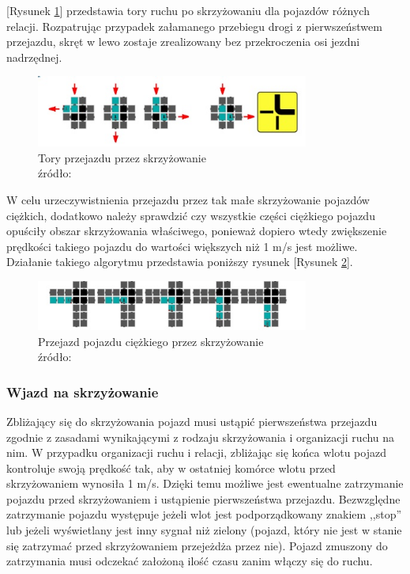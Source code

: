 \documentclass{sprawozdanie-agh}
\begin{document}
	[Rysunek \ref{fig:S2}] przedstawia tory ruchu po skrzyżowaniu dla pojazdów różnych relacji. Rozpatrując przypadek załamanego przebiegu drogi z pierwszeństwem przejazdu, skręt w lewo zostaje zrealizowany bez przekroczenia osi jezdni nadrzędnej.

	\begin{figure}[H]
		\centering
		\captionsetup{justification=centering}
		\includegraphics[width=0.8\textwidth]{S2.jpg}
		\caption{Tory przejazdu przez skrzyżowanie \\ źródło: \cite{artykulyNaPlycie}}
		\label{fig:S2}
	\end{figure}

	W celu urzeczywistnienia przejazdu przez tak małe skrzyżowanie pojazdów ciężkich, dodatkowo należy sprawdzić czy wszystkie części ciężkiego pojazdu opuściły obszar skrzyżowania właściwego, ponieważ dopiero wtedy zwiększenie prędkości takiego pojazdu do wartości większych niż 1 m/s jest możliwe. Działanie takiego algorytmu przedstawia poniższy rysunek [Rysunek \ref{fig:S3}].

	\begin{figure}[H]
		\centering
		\captionsetup{justification=centering}
		\includegraphics[width=0.8\textwidth]{S3.jpg}
		\caption{Przejazd pojazdu ciężkiego przez skrzyżowanie \\ źródło: \cite{artykulyNaPlycie}}
		\label{fig:S3}
	\end{figure}


	\subsubsection{Wjazd na skrzyżowanie}

	Zbliżający się do skrzyżowania pojazd musi ustąpić pierwszeństwa przejazdu zgodnie z zasadami wynikającymi z rodzaju skrzyżowania i organizacji ruchu na nim. W przypadku organizacji ruchu i relacji, zbliżając się końca wlotu pojazd kontroluje swoją prędkość tak, aby w ostatniej komórce wlotu przed skrzyżowaniem wynosiła 1 m/s. Dzięki temu możliwe jest ewentualne zatrzymanie pojazdu przed skrzyżowaniem i ustąpienie pierwszeństwa przejazdu. Bezwzględne zatrzymanie pojazdu występuje jeżeli wlot jest podporządkowany znakiem ,,stop” lub jeżeli wyświetlany jest inny sygnał niż zielony (pojazd, który nie jest w stanie się zatrzymać przed skrzyżowaniem przejeżdża przez nie). Pojazd zmuszony do zatrzymania musi odczekać założoną ilość czasu zanim włączy się do ruchu.
\end{document}
